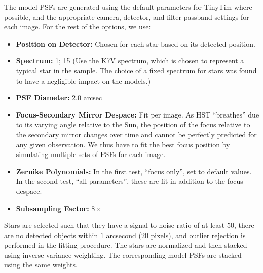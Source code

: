 \documentclass[useAMS,usenatbib]{mnras}
\begin{document}
The model PSFs are generated using the default parameters for TinyTim
where possible, and the appropriate camera, detector, and filter
passband settings for each image. For the rest of the options, we use:
\begin{itemize}
  \item \textbf{Position on Detector:} Chosen for each star based on its
detected position.
  \item \textbf{Spectrum:} 1; 15 (Use the K7V spectrum, which is chosen
to represent a typical star in the sample. The choice of a fixed
spectrum for stars was found to have a negligible impact on the
models.)
  \item \textbf{PSF Diameter:} 2.0 arcsec
  \item \textbf{Focus-Secondary Mirror Despace:} Fit per image. As HST
    ``breathes'' due to its varying angle relative to the Sun, the
    position of the focus relative to the secondary mirror changes
    over time and cannot be perfectly predicted for any given
    observation. We thus have to fit the best focus position by
    simulating multiple sets of PSFs for each image.
  \item \textbf{Zernike Polynomials:} In the first test, ``focus
    only'', set to default values. In the second test, ``all
    parameters'', these are fit in addition to the focus despace.
  \item \textbf{Subsampling Factor:} $8\times$
\end{itemize}

Stars are selected such that they have a signal-to-noise ratio of at
least $50$, there are no detected objects within $1$ arcsecond ($20$
pixels), and outlier rejection is performed in the fitting procedure.
The stars are normalized and then stacked using inverse-variance
weighting. The corresponding model PSFs are stacked using the same
weights.

%
\end{document}
